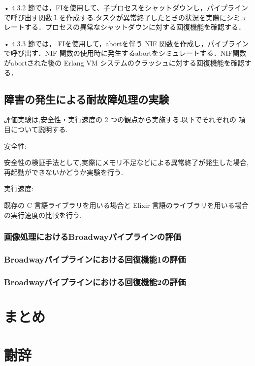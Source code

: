 \documentclass[a4paper]{jreport}	%
\begin{document}
• 4.3.2 節では，FIを使用して、子プロセスをシャットダウンし，パイプラインで呼び出す関数１を作成する.タスクが異常終了したときの状況を実際にシミュレートする．プロセスの異常なシャットダウンに対する回復機能を確認する．

• 4.3.3 節では， FIを使用して，abortを伴う NIF 関数を作成し，パイプラインで呼び出す．NIF 関数の使用時に発生するabortをシミュレートする．NIF関数がabortされた後の Erlang VM システムのクラッシュに対する回復機能を確認する．


\section{障害の発生による耐故障処理の実験}
評価実験は,安全性・実行速度の 2 つの観点から実施する.以下でそれぞれの 項目について説明する.

安全性:

安全性の検証手法として,実際にメモリ不足などによる異常終了が発生した場合,再起動ができないかどうか実験を行う.

実行速度: 

既存の C 言語ライブラリを用いる場合と Elixir 言語のライブラリを用いる場合の実行速度の比較を行う.
\subsection{画像処理におけるBroadwayパイプラインの評価} 

\subsection{Broadwayパイプラインにおける回復機能1の評価} 

\subsection{Broadwayパイプラインにおける回復機能2の評価}



\chapter{まとめ}

\chapter*{謝辞}



\newpage
{}
\renewcommand{\bibname}{参考文献}
\end{document}
